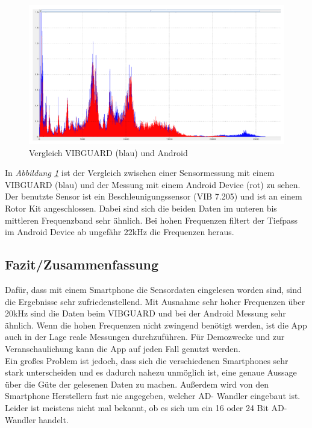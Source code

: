 \documentclass{article}
\begin{document}
{					\begin{figure}
						\includegraphics[scale=0.5]{Bilder/vergleich.png}
						\centering
						\vspace{0 cm}
						\caption{Vergleich VIBGUARD (blau) und Android}
						\label{fig7}	
					\end{figure}

					In \textit{Abbildung \ref{fig7}} ist der Vergleich zwischen einer Sensormessung mit einem VIBGUARD (blau) und der Messung mit einem Android Device (rot) zu sehen. Der benutzte Sensor ist ein Beschleunigungssensor (VIB 7.205) und ist an einem Rotor Kit angeschlossen. Dabei sind sich die beiden Daten im unteren bis mittleren Frequenzband sehr ähnlich. Bei hohen Frequenzen filtert der Tiefpass im Android Device ab ungefähr 22kHz die Frequenzen heraus.


	\subsection{Fazit/Zusammenfassung}
					Dafür, dass mit einem Smartphone die Sensordaten eingelesen worden sind, sind die Ergebnisse sehr zufriedenstellend. Mit Ausnahme sehr hoher Frequenzen über 20kHz sind die Daten beim VIBGUARD und bei der Android Messung sehr ähnlich.
					Wenn die hohen Frequenzen nicht zwingend benötigt werden, ist die App auch in der Lage reale Messungen durchzuführen.
					Für Demozwecke und zur Veranschaulichung kann die App auf jeden Fall genutzt werden.\\
					Ein großes Problem ist jedoch, dass sich die verschiedenen Smartphones sehr stark unterscheiden und es dadurch nahezu unmöglich ist, eine genaue Aussage über die Güte der gelesenen Daten zu machen. Außerdem wird von den Smartphone Herstellern fast nie angegeben, welcher AD- Wandler eingebaut ist. Leider ist meistens nicht mal bekannt, ob es sich um ein 16 oder 24 Bit AD-Wandler handelt.

}
\end{document}
